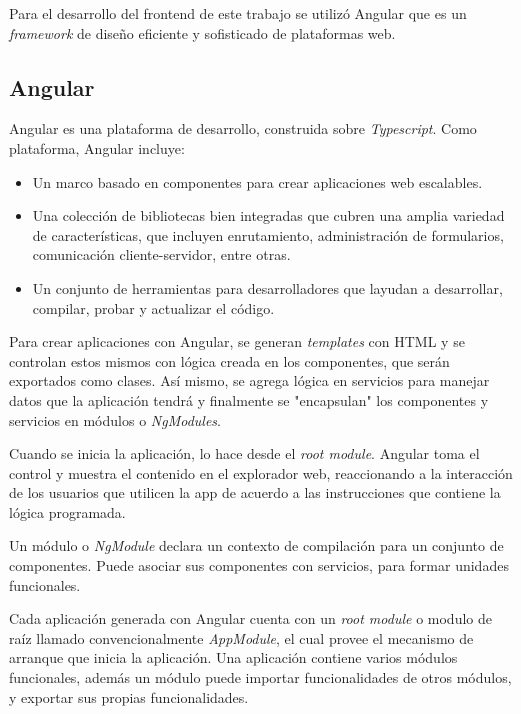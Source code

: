 Para el desarrollo del frontend de este trabajo se utilizó Angular\citep{WEBSITE:29} que es un \textit{framework} de diseño eficiente y sofisticado de plataformas web. 

\subsection{Angular}

Angular es una plataforma de desarrollo, construida sobre \textit{Typescript}\citep{WEBSITE:30}. Como plataforma, Angular incluye:

\begin{itemize}
	\item Un marco basado en componentes para crear aplicaciones web escalables.
	
	\item Una colección de bibliotecas bien integradas que cubren una amplia variedad de características, que incluyen enrutamiento, administración de formularios, comunicación cliente-servidor, entre otras.
	
	\item Un conjunto de herramientas para desarrolladores que layudan a desarrollar, compilar, probar y actualizar el código.
	
\end{itemize}

Para crear aplicaciones con Angular, se generan \textit{templates} con HTML y se controlan estos mismos con lógica creada en los componentes, que serán exportados como clases. Así mismo, se agrega lógica en servicios para manejar datos que la aplicación tendrá y finalmente se "encapsulan" los componentes y servicios en módulos o \textit{NgModules}.

Cuando se inicia la aplicación, lo hace desde el \textit{root module}. Angular toma el control y muestra el contenido en el explorador web, reaccionando a la interacción de los usuarios que utilicen la app de acuerdo a las instrucciones que contiene la lógica programada.

Un módulo o \textit{NgModule} declara un contexto de compilación para un conjunto de componentes. Puede asociar sus componentes con servicios, para formar unidades funcionales. 

Cada aplicación generada con Angular cuenta con un \textit{root module} o modulo de raíz llamado convencionalmente \textit{AppModule}, el cual provee el mecanismo de arranque que inicia la aplicación. Una aplicación contiene varios módulos funcionales, además un módulo puede importar funcionalidades de otros módulos, y exportar sus propias funcionalidades. 

